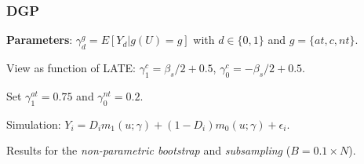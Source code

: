 \documentclass[11pt, aspectratio=169]{beamer}
\begin{document}











\begin{frame}
    \frametitle{DGP}

    \textbf{Parameters}: $\gamma_d^g = E[Y_d|g(U)=g]$ with $d\in\{0,1\}$ and $g = \{at, c, nt\}$.

    \vspace{0.5cm}

    View as function of LATE\@: $\gamma_1^c = \beta_s/2 + 0.5$, $\gamma_0^c = -\beta_s/2 + 0.5$.

    \vspace{0.5cm}

    Set $\gamma_1^{at} = 0.75$ and $\gamma_0^{nt} = 0.2$.

    \vspace{0.5cm}

    Simulation: $Y_i = D_i m_1(u;\gamma) + (1-D_i)m_0(u;\gamma) + \epsilon_i$.

    \pause

    \vspace{0.5cm}

    Results for the \textit{non-parametric bootstrap} and \textit{subsampling} ($B = 0.1\times N$).

\end{frame}
\end{document}
